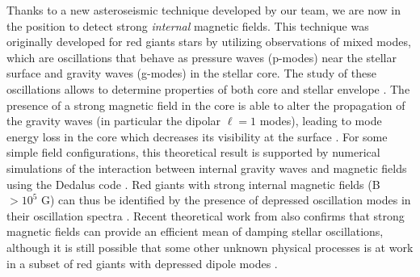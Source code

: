 Thanks to a new asteroseismic technique developed by our team, we are now in the position to detect strong {\it internal} magnetic fields. This technique was originally developed for red giants stars by utilizing observations of mixed modes, which are oscillations that behave as pressure waves (p-modes) near the stellar surface and gravity waves (g-modes) in the stellar core. The study of these oscillations allows to determine properties of both core and stellar envelope \citep[e.g][]{Beck_2011}. The presence of a strong magnetic field in the core is able to alter the propagation of the gravity waves (in particular the dipolar $\ell =1$ modes),
leading to mode energy loss in the core which decreases its visibility at the surface \citep{Fuller_2015}. For some simple field configurations, this theoretical result is supported  by numerical simulations of the interaction between internal gravity waves and magnetic fields using the Dedalus code \citep{Lecoanet_2016}. Red giants with strong internal magnetic fields (B $> 10^5$ G) can thus be identified by the presence of depressed oscillation modes in their oscillation spectra \citep{Fuller_2015,Stello_2016}. Recent theoretical work from \citet{2017MNRAS.467.3212L} also confirms that  strong magnetic fields can provide an efficient mean of damping stellar oscillations, although it is still possible that some other unknown physical processes is at work in a subset of red giants with depressed dipole modes \citet{Mosser_2017}.

